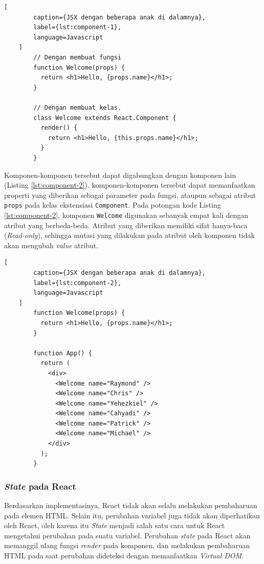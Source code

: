     \begin{lstlisting}[
        caption={JSX dengan beberapa anak di dalamnya}, 
        label={lst:component-1}, 
        language=Javascript
    ]
        // Dengan membuat fungsi
        function Welcome(props) {
          return <h1>Hello, {props.name}</h1>;
        }
        
        // Dengan membuat kelas.
        class Welcome extends React.Component {
          render() {
            return <h1>Hello, {this.props.name}</h1>;
          }
        }
    \end{lstlisting}
    
    Komponen-komponen tersebut dapat digabungkan dengan komponen lain (Listing
    \ref{lst:component-2}). komponen-komponen tersebut dapat memanfaatkan
    properti yang diberikan sebagai parameter pada fungsi, ataupun sebagai
    atribut \texttt{props} pada kelas ekstensiasi \texttt{Component}. Pada
    potongan kode Listing \ref{lst:component-2}, komponen \texttt{Welcome}
    digunakan sebanyak empat kali dengan atribut yang berbeda-beda. Atribut yang
    diberikan memiliki sifat hanya-baca (\textit{Read-only}), sehingga mutasi
    yang dilakukan pada atribut oleh komponen tidak akan mengubah \textit{value}
    atribut.
    
    \begin{lstlisting}[
        caption={JSX dengan beberapa anak di dalamnya}, 
        label={lst:component-2}, 
        language=Javascript
    ]
        function Welcome(props) {
          return <h1>Hello, {props.name}</h1>;
        }
        
        function App() {
          return (
            <div>
              <Welcome name="Raymond" />
              <Welcome name="Chris" />
              <Welcome name="Yehezkiel" />
              <Welcome name="Cahyadi" />
              <Welcome name="Patrick" />
              <Welcome name="Michael" />
            </div>
          );
        }
    \end{lstlisting}
    
    
    \subsubsection{\textit{State} pada React} Berdasarkan implementasinya, React
    tidak akan selalu melakukan pembaharuan pada elemen HTML. Selain itu,
    perubahan variabel juga tidak akan diperhatikan oleh React, oleh karena itu
    \textit{State} menjadi salah satu cara untuk React mengetahui perubahan pada
    suatu variabel. Perubahan \textit{state} pada React akan memanggil ulang
    fungsi \textit{render} pada komponen, dan melakukan pembaharuan HTML pada
    saat perubahan dideteksi dengan memanfaatkan \textit{Virtual DOM}.
    
